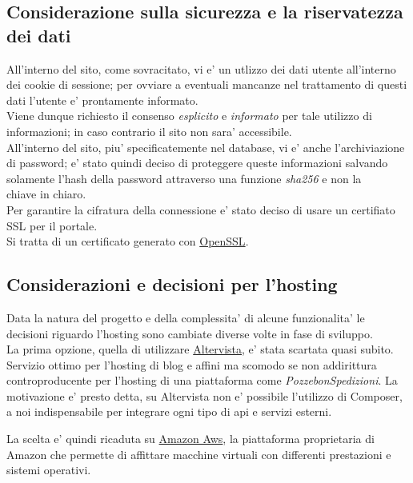 \documentclass[a4paper, 12pt]{report}
\begin{document}
\subsection{Considerazione sulla sicurezza e la riservatezza dei dati}
All'interno del sito, come sovracitato, vi e' un utlizzo dei dati utente all'interno dei cookie di sessione; per ovviare a eventuali mancanze nel trattamento di questi dati l'utente e' prontamente informato.\\ 
Viene dunque richiesto il consenso \textit{esplicito} e \textit{informato} per tale utilizzo di informazioni; in caso contrario il sito non sara' accessibile. \\


All'interno del sito, piu' specificatemente nel database, vi e' anche l'archiviazione di password; e' stato quindi deciso di proteggere queste
informazioni salvando solamente l'hash della password attraverso una funzione \textit{sha256} e non la \\ chiave in chiaro. \\ 

Per garantire la cifratura della connessione e' stato deciso di usare un certifiato SSL per il portale. \\ 
Si tratta di un certificato generato con \href{https://www.openssl.org/}{OpenSSL}.

\subsection{Considerazioni e decisioni per l'hosting}
Data la natura del progetto e della complessita' di alcune funzionalita' le decisioni riguardo l'hosting sono cambiate diverse volte 
in fase di sviluppo. \\ La prima opzione, quella di utilizzare \href{https://it.altervista.org/}{Altervista},  e' stata scartata quasi subito. \\
Servizio ottimo per l'hosting di blog e affini ma scomodo se non addirittura controproducente per l'hosting di una piattaforma
come \textit{PozzebonSpedizioni}. La motivazione e' presto detta, su Altervista non e' possibile l'utilizzo di Composer, a noi indispensabile
per integrare ogni tipo di api e servizi esterni.

La scelta e' quindi ricaduta su \href{https://aws.amazon.com/free/?trk=ps_a134p000003yhhNAAQ&trkCampaign=acq_paid_search_brand&sc_channel=ps&sc_campaign=acquisition_IT&sc_publisher=google&sc_category=core&sc_country=IT&sc_geo=EMEA&sc_outcome=Acquisition&sc_detail=amazon%20aws&sc_content=Amazon%20AWS_e&sc_matchtype=e&sc_segment=455721528683&sc_medium=ACQ-P|PS-GO|Brand|Desktop|SU|AWS|Core|IT|EN|Text&s_kwcid=AL!4422!3!455721528683!e!!g!!amazon%20aws&ef_id=CjwKCAjwvMqDBhB8EiwA2iSmPChyXfcgliX39hxNQ-chnJF4pTgh37C5ky8iupvY3PSirs-CU-Xt7xoCjZgQAvD_BwE:G:s&s_kwcid=AL!4422!3!455721528683!e!!g!!amazon%20aws&all-free-tier.sort-by=item.additionalFields.SortRank&all-free-tier.sort-order=asc}{Amazon Aws}, 
la piattaforma proprietaria di Amazon che permette di affittare macchine virtuali con differenti prestazioni e sistemi operativi.
\end{document}
